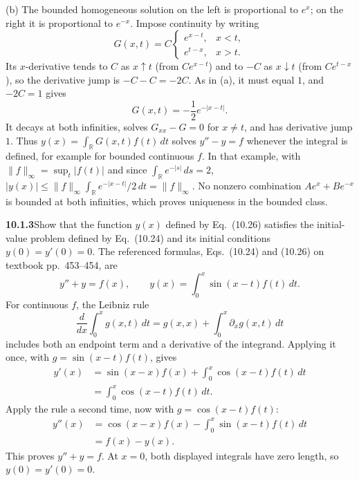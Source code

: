 (b) 
The bounded homogeneous solution on the left is proportional to $e^x$;
on the right it is proportional to $e^{-x}$. Impose continuity by writing
\[
G(x,t)=C\begin{cases}e^{x-t},&x<t,\\e^{t-x},&x>t.\end{cases}
\]
Its $x$-derivative tends to $C$ as $x\uparrow t$ (from $Ce^{x-t}$) and
to $-C$ as $x\downarrow t$ (from $Ce^{t-x}$), so the derivative jump is
$-C-C=-2C$. As in (a), it must equal $1$, and $-2C=1$ gives
\[
\boxed{G(x,t)=-\frac12e^{-|x-t|}.}
\]
It decays at both infinities, solves $G_{xx}-G=0$ for $x\ne t$, and
has derivative jump $1$. Thus $y(x)=\int_{\mathbb R}G(x,t)f(t)\,dt$
solves $y''-y=f$ whenever the integral is defined, for example for
bounded continuous $f$. In that example, with
$\|f\|_\infty=\sup_t|f(t)|$ and since $\int_{\mathbb R}e^{-|s|}\,ds=2$,
$|y(x)|\le\|f\|_\infty\int_{\mathbb R}e^{-|x-t|}/2\,dt
=\|f\|_\infty$.
No nonzero combination $Ae^x+Be^{-x}$ is bounded at both infinities,
which proves uniqueness in the bounded class.

\par\bigskip
\noindent\textbf{10.1.3}\quad Show that the function $y(x)$ defined by
Eq.~(10.26) satisfies the initial-value problem defined by Eq.~(10.24) and its
initial conditions $y(0)=y'(0)=0$.
\solution
The referenced formulas, Eqs.~(10.24) and (10.26) on textbook
pp.~453--454, are
\[
y''+y=f(x),\qquad y(x)=\int_0^x\sin(x-t)f(t)\,dt.
\]
For continuous $f$, the Leibniz rule
\[
\frac{d}{dx}\int_0^xg(x,t)\,dt=g(x,x)+\int_0^x\partial_xg(x,t)\,dt
\]
includes both an endpoint term and a derivative of the integrand.
Applying it once, with $g=\sin(x-t)f(t)$, gives
\begin{align*}
y'(x)&=\sin(x-x)f(x)+\int_0^x\cos(x-t)f(t)\,dt\\
&=\int_0^x\cos(x-t)f(t)\,dt.
\end{align*}
Apply the rule a second time, now with $g=\cos(x-t)f(t)$:
\begin{align*}
y''(x)&=\cos(x-x)f(x)-\int_0^x\sin(x-t)f(t)\,dt\\
&=f(x)-y(x).
\end{align*}
This proves $y''+y=f$. At $x=0$, both displayed integrals have zero
length, so $y(0)=y'(0)=0$.

